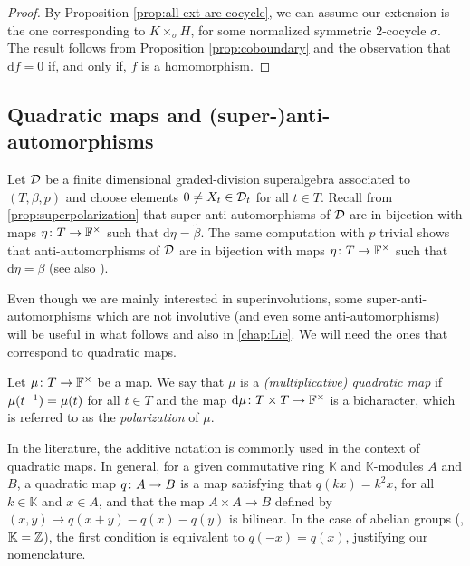 \begin{proof}
	By Proposition \ref{prop:all-ext-are-cocycle}, we can assume our extension is the one corresponding to $K \times_\sigma H$, for some normalized symmetric $2$-cocycle $\sigma$.
	The result follows from Proposition \ref{prop:coboundary} and the observation that $\mathrm{d}f = 0$ if, and only if, $f$ is a homomorphism.
\end{proof}

\subsection{Quadratic maps and (super-)anti-automorphisms}

Let $\mathcal{D}$ be a finite dimensional graded-division superalgebra associated to $(T, \beta, p)$ and choose elements $0\neq X_t \in \mathcal{D}_t$ for all $t\in T$. 
Recall from \cref{prop:superpolarization} that super-anti-automorphisms of $\mathcal{D}$ are in bijection with maps $\eta\colon T \to \mathbb{F}^\times$ such that $\mathrm{d}\eta = \tilde\beta$. 
The same computation with $p$ trivial shows that anti-automorphisms of $\mathcal{D}$ are in bijection with maps $\eta\colon T \to \mathbb{F}^\times$ such that $\mathrm{d}\eta = \beta$ (see also \cite{livromicha}). 

Even though we are mainly interested in superinvolutions, some su\-per-an\-ti-au\-to\-mor\-phisms which are not involutive (and even some an\-ti-au\-to\-mor\-phisms) will be useful in what follows and also in \cref{chap:Lie}. 
We will need the ones that correspond to quadratic maps.

\begin{defi}
	Let $\mu\colon T \to \mathbb{F}^\times$ be a map.
	We say that $\mu$ is a \emph{(multiplicative) quadratic map} if $\mu(t^{-1}) = \mu (t)$ for all $t\in T$ and the map $\mathrm{d}\mu\colon T\times T \to \mathbb{F}^\times$ 
	is a bicharacter, which is referred to as the \emph{polarization} of $\mu$.
\end{defi}

\begin{remark}
	In the literature, the additive notation is commonly used in the context of quadratic maps.
	In general, for a given commutative ring $\mathbb K$ and $\mathbb K$-modules $A$ and $B$, a quadratic map $q\colon A \to B$ is a map satisfying that $q(kx) = k^2 x$, for all $k\in \mathbb K$ and $x \in A$, and that the map $A \times A \to B$ defined by $(x,y) \mapsto q(x+y) - q(x) - q(y)$ is bilinear.
	In the case of abelian groups (\ie, $\mathbb K = \mathbb{Z}$), the first condition is equivalent to $q(-x) = q(x)$, justifying our nomenclature. 
\end{remark}

